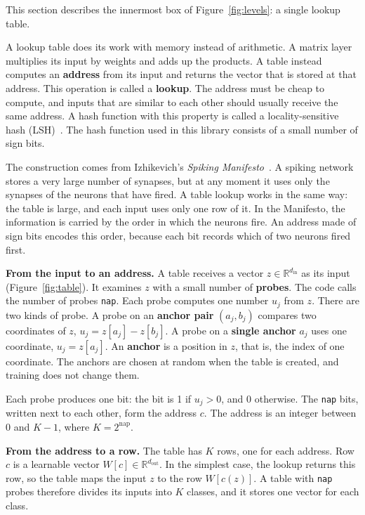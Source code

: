 \documentclass[11pt]{article}
\DeclareRobustCommand{\code}[1]{{\renewcommand{\_}{\textunderscore\allowbreak}\texttt{#1}}}
\newcommand{\term}[1]{\textbf{#1}}
\begin{document}
This section describes the innermost box of Figure~\ref{fig:levels}: a single lookup table.

A lookup table does its work with memory instead of arithmetic. A matrix layer multiplies its input by
weights and adds up the products. A table instead computes an \term{address} from its input and returns
the vector that is stored at that address. This operation is called a \term{lookup}. The address must be
cheap to compute, and inputs that are similar to each other should usually receive the same address. A
hash function with this property is called a locality-sensitive hash (LSH)~\citep{lsh}. The hash function
used in this library consists of a small number of sign bits.

The construction comes from Izhikevich's \emph{Spiking Manifesto}~\citep{manifesto}. A spiking network
stores a very large number of synapses, but at any moment it uses only the synapses of the neurons that
have fired. A table lookup works in the same way: the table is large, and each input uses only one row of
it. In the Manifesto, the information is carried by the order in which the neurons fire. An address made
of sign bits encodes this order, because each bit records which of two neurons fired first.

\textbf{From the input to an address.} A table receives a vector $z\in\mathbb{R}^{d_\text{in}}$ as its
input (Figure~\ref{fig:table}). It examines $z$ with a small number of \term{probes}. The code calls the
number of probes \code{nap}. Each probe computes one number $u_j$ from $z$. There are two kinds of probe.
A probe on an \term{anchor pair} $(a_j,b_j)$ compares two coordinates of $z$, $u_j=z[a_j]-z[b_j]$. A
probe on a \term{single anchor} $a_j$ uses one coordinate, $u_j=z[a_j]$. An \term{anchor} is a position
in $z$, that is, the index of one coordinate. The anchors are chosen at random when the table is created,
and training does not change them.

Each probe produces one bit: the bit is 1 if $u_j>0$, and 0 otherwise. The \code{nap} bits, written next
to each other, form the address $c$. The address is an integer between $0$ and $K-1$, where
$K=2^{\text{nap}}$.

\textbf{From the address to a row.} The table has $K$ rows, one for each address. Row $c$ is a learnable
vector $W[c]\in\mathbb{R}^{d_\text{out}}$. In the simplest case, the lookup returns this row, so the
table maps the input $z$ to the row $W[c(z)]$. A table with \code{nap} probes therefore divides its
inputs into $K$ classes, and it stores one vector for each class.
\end{document}
